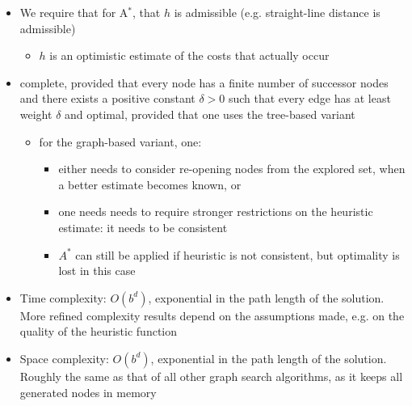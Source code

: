 {{{{{\begin{minipage}[t]{8cm}
\begin{itemize}
                  \begin{itemize}
                    \item $g(v) =$ actual cost from the start node to $v$
                    \item $h(v) =$ estimated cost from $v$ to the nearest target node
                    \item $f(v) = g(v) + h(v) =$ the estimated cost of the cheapest path through $v$
                  \end{itemize}
                  \item We require that for A$^*$, that $h$ is admissible (e.g. straight-line distance is admissible)
                  \begin{itemize}
                    \item $h$ is an \alert{optimistic estimate} of the costs that actually occur
                  \end{itemize}
                  \item \alert{complete}, provided that every node has a finite number of successor nodes and there exists a positive constant $\delta > 0$ such that every edge has at least weight $\delta$ and \alert{optimal}, provided that one uses the \alert{tree-based} variant
                  \begin{itemize}
                    \item for the \alert{graph-based} variant, one:
                    \begin{itemize}
                      \item either needs to consider re-opening nodes from the explored set, when a better estimate becomes known, or
                      \item one needs needs to require stronger restrictions on the heuristic estimate: it needs to be \alert{consistent}
                      \item $A^*$ can still be applied if heuristic is not consistent, but \alert{optimality is lost} in this case
                    \end{itemize}
                  \end{itemize}
                  \item \alert{Time complexity:} $O(b^d)$, exponential in the path length of the solution. More refined complexity results depend on the assumptions made, e.g. on the quality of the heuristic function
                  \item \alert{Space complexity:} $O(b^d)$, exponential in the path length of the solution. Roughly the same as that of all other graph search algorithms, as it keeps all generated nodes in memory

\end{itemize}
\end{minipage}}}}}}

